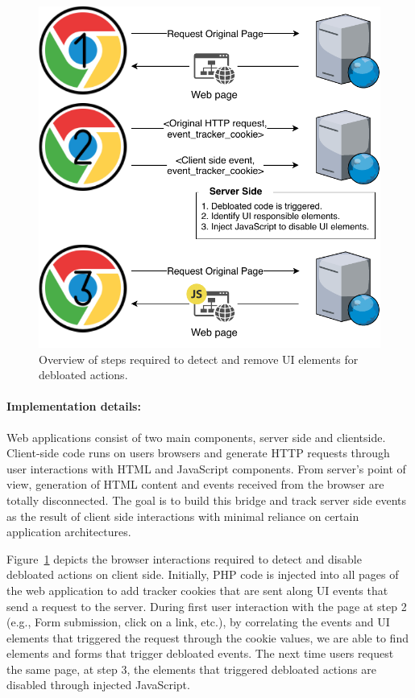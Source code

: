 \begin{figure}[t]
  \centering
  \includegraphics[width=0.7\linewidth]{figures/UI-backend-debloating.pdf}
  \caption{Overview of steps required to detect and remove UI elements for debloated actions.}
  \label{fig:uidebloating}
\end{figure}

\paragraph{Implementation details:} Web applications consist of two main components, server side and clientside. Client-side code runs on users browsers and generate HTTP requests through user interactions with HTML and JavaScript components. From server's point of view, generation of HTML content and events received from the browser are totally disconnected. The goal is to build this bridge and track server side events as the result of client side interactions with minimal reliance on certain application architectures.

Figure~\ref{fig:uidebloating} depicts the browser interactions required to detect and disable debloated actions on client side. Initially, PHP code is injected into all pages of the web application to add tracker cookies that are sent along UI events that send a request to the server. During first user interaction with the page at step 2 (e.g., Form submission, click on a link, etc.), by correlating the events and UI elements that triggered the request through the cookie values, we are able to find elements and forms that trigger debloated events. The next time users request the same page, at step 3, the elements that triggered debloated actions are disabled through injected JavaScript.

